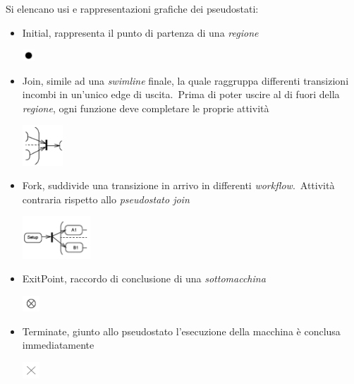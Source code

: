 \documentclass{article}
\begin{document}
\pagebreak
Si elencano usi e rappresentazioni grafiche dei pseudostati:
\begin{itemize}[label={-}]
    \itemsep0em
    \item Initial, rappresenta il punto di partenza di una \textit{regione}
    \begin{center}
        \includegraphics[width=0.035\textwidth]{foto 3.png}
    \end{center}
    \item Join, simile ad una \textit{swimline} finale, la quale raggruppa differenti transizioni incombi in un'unico edge di uscita.\ Prima di poter uscire al di fuori della \textit{regione}, ogni funzione deve completare le proprie attività
    \begin{center}
        \includegraphics[width=0.12\textwidth]{foto 4.png}
    \end{center}
    \item Fork, suddivide una transizione in arrivo in differenti \textit{workflow}.\ Attività contraria rispetto allo \textit{pseudostato join}
    \begin{center}
        \includegraphics[width=0.2\textwidth]{foto 5.png}
    \end{center}
    \item ExitPoint, raccordo di conclusione di una \textit{sottomacchina}
    \begin{center}
        \includegraphics[width=0.05\textwidth]{foto 6.png}
    \end{center}
    \item Terminate, giunto allo pseudostato l'esecuzione della macchina è conclusa immediatamente
    \begin{center}
        \includegraphics[width=0.05\textwidth]{foto 7.png}
    \end{center}
\end{itemize}
\end{document}
